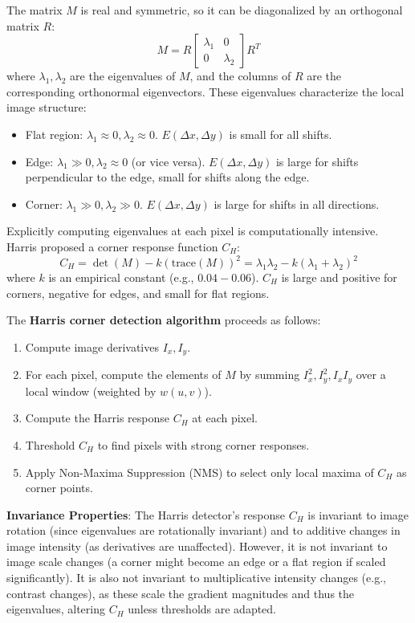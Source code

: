 The matrix $M$ is real and symmetric, so it can be diagonalized by an orthogonal matrix $R$:
\[ M = R\begin{bmatrix} \lambda_1 & 0 \\ 0 & \lambda_2 \end{bmatrix}R^T \]
where $\lambda_1, \lambda_2$ are the eigenvalues of $M$, and the columns of $R$ are the corresponding orthonormal eigenvectors. These eigenvalues characterize the local image structure:
\begin{itemize}
    \item Flat region: $\lambda_1 \approx 0, \lambda_2 \approx 0$. $E(\Delta x, \Delta y)$ is small for all shifts.
    \item Edge: $\lambda_1 \gg 0, \lambda_2 \approx 0$ (or vice versa). $E(\Delta x, \Delta y)$ is large for shifts perpendicular to the edge, small for shifts along the edge.
    \item Corner: $\lambda_1 \gg 0, \lambda_2 \gg 0$. $E(\Delta x, \Delta y)$ is large for shifts in all directions.
\end{itemize}
Explicitly computing eigenvalues at each pixel is computationally intensive. Harris proposed a corner response function $C_H$:
\[ C_H = \det(M) - k (\text{trace}(M))^2 = \lambda_1 \lambda_2 - k (\lambda_1 + \lambda_2)^2 \]
where $k$ is an empirical constant (e.g., $0.04-0.06$).
$C_H$ is large and positive for corners, negative for edges, and small for flat regions.

The \textbf{Harris corner detection algorithm} proceeds as follows:
\begin{enumerate}
  \item Compute image derivatives $I_x, I_y$.
  \item For each pixel, compute the elements of $M$ by summing $I_x^2, I_y^2, I_xI_y$ over a local window (weighted by $w(u,v)$).
  \item Compute the Harris response $C_H$ at each pixel.
  \item Threshold $C_H$ to find pixels with strong corner responses.
  \item Apply Non-Maxima Suppression (NMS) to select only local maxima of $C_H$ as corner points.
\end{enumerate}

\textbf{Invariance Properties}:
The Harris detector's response $C_H$ is invariant to image rotation (since eigenvalues are rotationally invariant) and to additive changes in image intensity (as derivatives are unaffected).
However, it is not invariant to image scale changes (a corner might become an edge or a flat region if scaled significantly). It is also not invariant to multiplicative intensity changes (e.g., contrast changes), as these scale the gradient magnitudes and thus the eigenvalues, altering $C_H$ unless thresholds are adapted.

